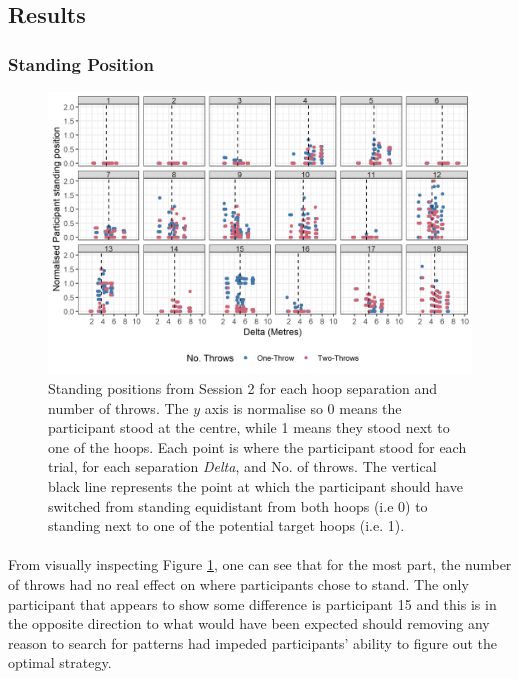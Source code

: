 \documentclass[12pt]{article}
\begin{document}
\subsection*{Results}
\subsubsection*{Standing Position}
\begin{figure}[ht!]
	\includegraphics[scale=0.9]{Figures/Experiment_2_Two_throw/Part2_BOTH_AvG_allpoints}
	\centering
	\captionsetup{justification=centering}
	\caption{Standing positions from Session 2 for each hoop separation and number of throws. The $y$ axis is normalise so 0 means the participant stood at the centre, while 1 means they stood next to one of the hoops. Each point is where the participant stood for each trial, for each separation \textit{Delta}, and No. of throws. The vertical black line represents the point at which the participant should have switched from standing equidistant from both hoops (i.e 0) to standing next to one of the potential target hoops (i.e. 1).}
	\label{fig:Session2-TwoThrows} 
\end{figure}

\paragraph{} From visually inspecting Figure \ref{fig:Session2-TwoThrows}, one can see that for the most part, the number of throws had no real effect on where participants chose to stand. The only participant that appears to show some difference is participant 15 and this is in the opposite direction to what would have been expected should removing any reason to search for patterns had impeded participants' ability to figure out the optimal strategy. 
\end{document}
